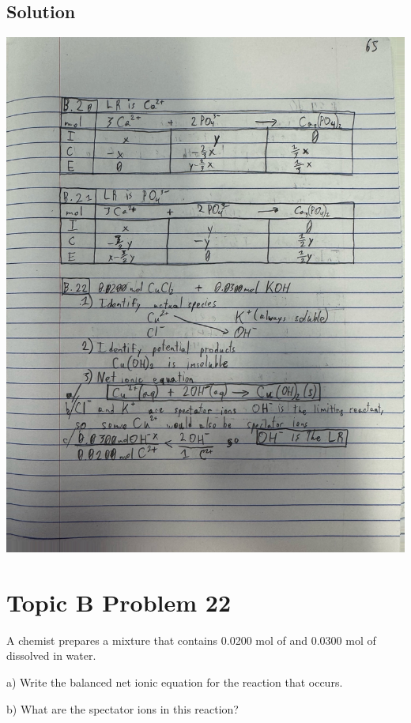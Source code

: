 \documentclass[10pt]{article}
\begin{document}
        \subsection{Solution}
            \begin{center}
                \includegraphics[width=\textwidth, trim={5in 30in 3in 15in},clip]{"Answers Images/IMG_6651.jpg"}
            \end{center}

    \pagebreak
    \section{Topic B Problem 22}
        A chemist prepares a mixture that contains 0.0200 mol of  and 0.0300 mol of  dissolved in water.
        
        a) Write the balanced net ionic equation for the reaction that occurs.
        
        b) What are the spectator ions in this reaction?
        
\end{document}
